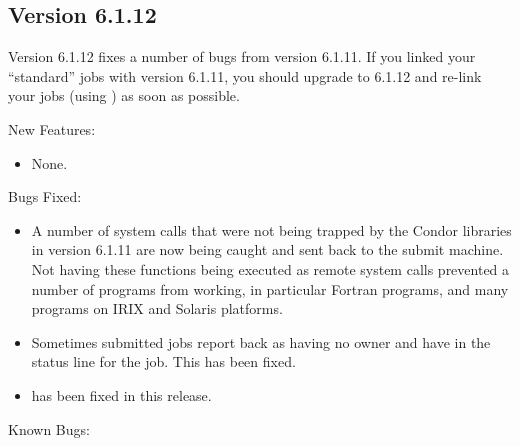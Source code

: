 \subsection{\label{sec:New-6-1-12}Version 6.1.12}

Version 6.1.12 fixes a number of bugs from version 6.1.11.
If you linked your ``standard'' jobs with version 6.1.11, you should
upgrade to 6.1.12 and re-link your jobs (using ) as soon as
possible.

\noindent New Features:

\begin{itemize}

\item None.

\end{itemize}

\noindent Bugs Fixed:

\begin{itemize}

\item A number of system calls that were not being trapped by the Condor
libraries in version 6.1.11 are now being caught and sent back to the
submit machine.
Not having these functions being executed as remote system calls prevented
a number of programs from working, in particular Fortran programs, and
many programs on IRIX and Solaris platforms.

\item Sometimes submitted jobs report back as having no owner and have
 in the status line for the job. This has been fixed.

\item {}  has been fixed in this release.

\end{itemize}

\noindent Known Bugs:

